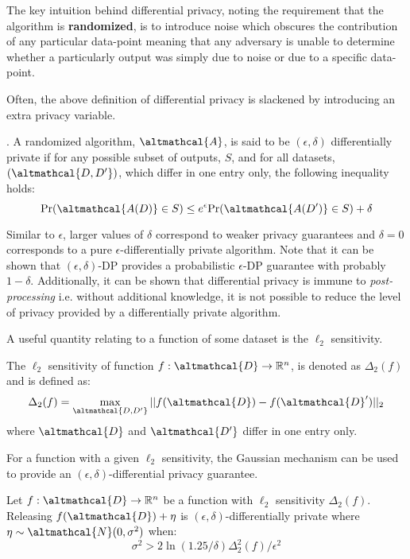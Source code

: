 The key intuition behind differential privacy, noting the requirement that the algorithm is \textbf{randomized}, is to introduce noise which obscures the contribution of any particular data-point meaning that any adversary is unable to determine whether a particularly output was simply due to noise or due to a specific data-point. 

Often, the above definition of differential privacy is slackened by introducing an extra privacy variable. 

\begin{definition}. A randomized algorithm, $\altmathcal{A}$, is said to be $(\epsilon, \delta)$ differentially private if for any possible subset of outputs, $S$, and for all datasets, $(\altmathcal{D, D'})$, which differ in one entry only, the following inequality holds:
	\begin{equation}
	\text{Pr}(\altmathcal{A(D)} \in S) \leq e^\epsilon \text{Pr}(\altmathcal{A(D')} \in S) + \delta
	\end{equation}
\end{definition}
Similar to $\epsilon$, larger values of $\delta$ correspond to weaker privacy guarantees and $\delta=0$ corresponds to a pure $\epsilon$-differentially private algorithm. Note that it can be shown that $(\epsilon, \delta)$-DP provides a probabilistic $\epsilon$-DP guarantee with probably $1-\delta$. Additionally, it can be shown that differential privacy is immune to \emph{post-processing} i.e. without additional knowledge, it is not possible to reduce the level of privacy provided by a differentially private algorithm. \cite{foundations}

A useful quantity relating to a function of some dataset is the $\ell_2$ sensitivity. 
\begin{definition}
	The $\ell_2$ sensitivity of function $f: \altmathcal{D} \rightarrow \mathbb{R}^n$, is denoted as $\Delta_2(f)$ and is defined as:
	\begin{align}
		\Delta_2(f) = \max_{\altmathcal{D, D'}} || f(\altmathcal{D}) - f(\altmathcal{D}')||_2
	\end{align}
	where $\altmathcal{D}$ and $\altmathcal{D'}$ differ in one entry only. 
\end{definition}
For a function with a given $\ell_2$ sensitivity, the Gaussian mechanism can be used to provide an $(\epsilon, \delta)$-differential privacy guarantee. 
\begin{theorem}
	Let $f: \altmathcal{D} \rightarrow \mathbb{R}^n$ be a function with $\ell_2$ sensitivity $\Delta_2(f)$. Releasing $f(\altmathcal{D}) + \eta$ is $(\epsilon, \delta)$-differentially private where $\eta \sim \altmathcal{N}(0, \sigma^2)$ when:
	\begin{equation}
	\sigma^2 > 2 \ln (1.25/ \delta) \Delta_2^2(f)/\epsilon^2
	\end{equation}
\end{theorem}
\cite{foundations}

